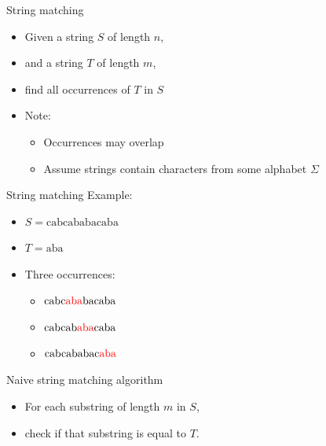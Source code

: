 \documentclass{beamer}
\begin{document}
	\begin{frame}[plain]{String matching}
		\begin{itemize}
			\item Given a string $S$ of length $n$,
			\item and a string $T$ of length $m$,
			\item find all occurrences of $T$ in $S$
		\end{itemize}
		\begin{itemize}
			\item Note:
			\begin{itemize}
				\item Occurrences may overlap
				\item Assume strings contain characters from some alphabet $\Sigma$
			\end{itemize}
		\end{itemize}
	\end{frame}
	
	\begin{frame}[plain]{String matching}
		Example:
		\begin{itemize}
			\item $S = \mathrm{cabcababacaba}$
			\item $T = \mathrm{aba}$
		\end{itemize}
		\begin{itemize}
			\item<2-> Three occurrences:
			\begin{itemize}
				\item<3-> $\mathrm{cabc{\color{red}{aba}}bacaba}$
				\item<4-> $\mathrm{cabcab{\color{red}{aba}}caba}$
				\item<5-> $\mathrm{cabcababac{\color{red}{aba}}}$
			\end{itemize}
		\end{itemize}
	\end{frame}
	
	\begin{frame}[plain]{Naive string matching algorithm}
		\begin{itemize}
			\item For each substring of length $m$ in $S$,
			\item check if that substring is equal to $T$.
		\end{itemize}
		
	\end{frame}
	
\end{document}
